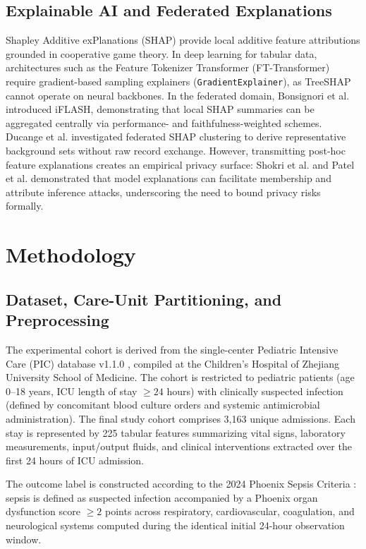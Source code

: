 \documentclass[runningheads]{llncs}
\begin{document}
\subsection{Explainable AI and Federated Explanations}
Shapley Additive exPlanations (SHAP) \cite{lundberg2017shap} provide local additive feature attributions grounded in cooperative game theory. In deep learning for tabular data, architectures such as the Feature Tokenizer Transformer (FT-Transformer) \cite{gorishniy2021revisiting} require gradient-based sampling explainers (\texttt{GradientExplainer}), as TreeSHAP cannot operate on neural backbones. In the federated domain, Bonsignori et al. \cite{bonsignori2026interpreting} introduced iFLASH, demonstrating that local SHAP summaries can be aggregated centrally via performance- and faithfulness-weighted schemes. Ducange et al. \cite{ducange2026federated} investigated federated SHAP clustering to derive representative background sets without raw record exchange. However, transmitting post-hoc feature explanations creates an empirical privacy surface: Shokri et al. \cite{shokri2021privacy} and Patel et al. \cite{patel2022model} demonstrated that model explanations can facilitate membership and attribute inference attacks, underscoring the need to bound privacy risks formally.

\section{Methodology}\label{sec:method}

\subsection{Dataset, Care-Unit Partitioning, and Preprocessing}
The experimental cohort is derived from the single-center Pediatric Intensive Care (PIC) database v1.1.0 \cite{zeng2020pic}, compiled at the Children's Hospital of Zhejiang University School of Medicine. The cohort is restricted to pediatric patients (age 0--18 years, ICU length of stay $\ge 24$ hours) with clinically suspected infection (defined by concomitant blood culture orders and systemic antimicrobial administration). The final study cohort comprises 3,163 unique admissions. Each stay is represented by 225 tabular features summarizing vital signs, laboratory measurements, input/output fluids, and clinical interventions extracted over the first 24 hours of ICU admission.

The outcome label is constructed according to the 2024 Phoenix Sepsis Criteria \cite{schlapbach2024phoenix,sanchezpinto2024phoenix}: sepsis is defined as suspected infection accompanied by a Phoenix organ dysfunction score $\ge 2$ points across respiratory, cardiovascular, coagulation, and neurological systems computed during the identical initial 24-hour observation window.
\end{document}
